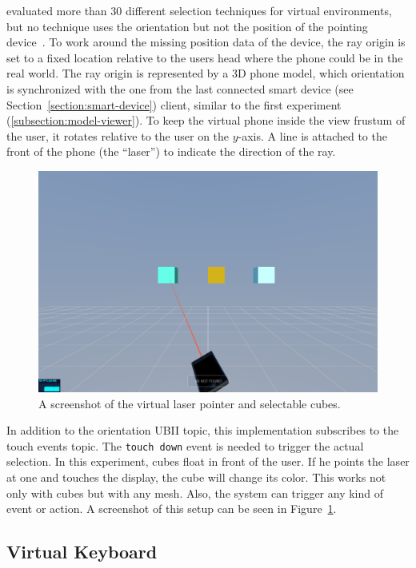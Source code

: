 \citeauthor{Argelaguet.2013} evaluated more than 30 different selection techniques for virtual environments, but no technique uses the orientation but not the position of the pointing device~\cite[Table 1]{Argelaguet.2013}. To work around the missing position data of the device, the ray origin is set to a fixed location relative to the users head where the phone could be in the real world. The ray origin is represented by a \ac{3D} phone model, which orientation is synchronized with the one from the last connected smart device (see Section~\ref{section:smart-device}) client, similar to the first experiment (\ref{subsection:model-viewer}). To keep the virtual phone inside the view frustum of the user, it rotates relative to the user on the \(y\)-axis.
A line is attached to the front of the phone (the \enquote{laser}) to indicate the direction of the ray.

\begin{figure}[H]
  \centering
  \includegraphics[width=12cm]{figures/implementation/screenshot_exp_lp.png}
  \caption[Screenshot of the laser pointer experiment]{A screenshot of the virtual laser pointer and selectable cubes.}\label{fig:screenshot-exp-lp}
\end{figure}

In addition to the orientation \ac{UBII} topic, this implementation subscribes to the touch events topic. The \lstinline{touch down} event is needed to trigger the actual selection.
In this experiment, cubes float in front of the user. If he points the laser at one and touches the display, the cube will change its color. This works not only with cubes but with any mesh. Also, the system can trigger any kind of event or action. A screenshot of this setup can be seen in Figure~\ref{fig:screenshot-exp-lp}.


\subsection{Virtual Keyboard}\label{subsection:virtual-keyboard}


